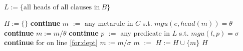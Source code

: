 \begin{algorithmic}\footnotesize

        \State $L :=  \{ \text{all heads of all clauses in} ~ B \}$

        \label{for:dept} 
            \State $H := \{\}$ 
                    \textbf{continue}
                \EndIf
                    \State $m$ $:=$ any metarule in $C$ s.t. $\mathit{mgu}(e, \mathit{head}(m)) = \theta$ 
                    \If{$\theta \neq \Box$} 
                        \textbf{continue}
                    \EndIf
                    \State $m := m / \theta$
                            \textbf{continue}
                        \EndIf
                        \State $p$ $:=$ any predicate in $L$ s.t. $\mathit{mgu}(l, p) = \sigma$ 
                        \If{$\sigma \neq \Box$} 
                            \textbf{continue} for on line \ref{for:dept} 
                        \EndIf
                        \State $m := m / \sigma$
                    \EndFor
                    \State $m$ $:=$ 
                    \State $H := H \cup \{ m \}$ 
                \EndWhile
            \EndFor
                \State \Return $H$
            \EndIf
        \EndFor
    \EndFunction
\end{algorithmic}

